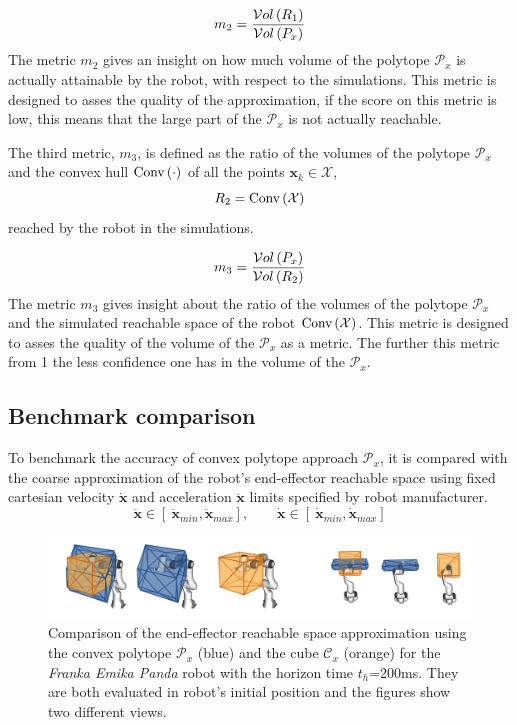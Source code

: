 \begin{equation}
    m_2 = \frac{\mathcal{V}ol\left( R_1\right)}{\mathcal{V}ol\left(P_x\right)}
\end{equation}
The metric $m_2$ gives an insight on how much volume of the polytope $\mathcal{P}_x$ is actually attainable by the robot, with respect to the simulations. This metric is designed to asses the quality of the approximation, if the score on this metric is low, this means that the large part of the $\mathcal{P}_x$ is not actually reachable.

The third metric, $m_3$, is defined as the ratio of the volumes of the polytope $\mathcal{P}_x$ and the convex hull $\text{Conv}\left(\cdot\right)$ of all the points $\bm{x}_k\in\mathcal{X}$, $$ R_2 = \text{Conv}\left(\mathcal{X}\right)$$ reached by the robot in the simulations.

\begin{equation}
    m_3 = \frac{\mathcal{V}ol\left(P_x\right)}{\mathcal{V}ol\left( R_2 \right)}
\end{equation}
The metric $m_3$ gives insight about the ratio of the volumes of the polytope $\mathcal{P}_x$ and the simulated reachable space of the robot $\text{Conv}\left(\mathcal{X}\right)$. This metric is designed to asses the quality of the volume of the $\mathcal{P}_x$ as a metric. The further this metric from 1 the less confidence one has in the volume of the $\mathcal{P}_x$.

\subsection{Benchmark comparison}

To benchmark the accuracy of convex polytope approach $\mathcal{P}_x$, it is compared with the coarse approximation of the robot's end-effector reachable space using fixed cartesian velocity $\dot{\bm{x}}$ and acceleration $\ddot{\bm{x}}$ limits specified by robot manufacturer.
\begin{equation}
    \ddot{\bm{x}}\in [~ \ddot{\bm{x}}_{min},  \ddot{\bm{x}}_{max}], \qquad \dot{\bm{x}} \in [~ \dot{\bm{x}}_{min},  \dot{\bm{x}}_{max}]
    \label{eq:limits_cart}
\end{equation}

\begin{figure}[!t]
    \centering
    \includegraphics[width=\linewidth]{Papers/images/comp_200.png}
    \caption{Comparison of the end-effector reachable space approximation using the convex polytope $\mathcal{P}_x$ (blue) and the cube $\mathcal{C}_x$ (orange) for the \textit{Franka Emika Panda} robot with the horizon time $t_h$=200ms. They are both evaluated in robot's initial position and the figures show two different views.}
    \label{fig:cube}

\end{figure}


